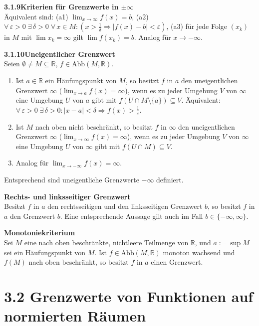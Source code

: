 \documentclass[a4paper,12pt]{article}
\newcommand{\gentry}[3]{%
  \noindent\textbf{#1\quad #2}\nopagebreak\\[0.2em]
  #3\par\smallskip
}
\begin{document}
\gentry{3.1.9}{Kriterien f\"ur Grenzwerte in $\pm\infty$}{%
  \"Aquivalent sind:
  (a1) $\lim_{x \to \infty} f(x) = b$,
  (a2) $\forall\, \varepsilon > 0 \; \exists\, \delta > 0 \; \forall\, x \in M:
       (x > \tfrac{1}{\delta} \Rightarrow |f(x) - b| < \varepsilon)$,
  (a3) f\"ur jede Folge $(x_k)$ in $M$ mit $\lim x_k = \infty$ gilt $\lim f(x_k) = b$.
  Analog f\"ur $x \to -\infty$.
}

\gentry{3.1.10}{Uneigentlicher Grenzwert}{%
  Seien $\emptyset \neq M \subseteq \mathbb{R}$, $f \in \mathrm{Abb}(M, \mathbb{R})$.
  \begin{enumerate}[label=(\arabic*),topsep=2pt,itemsep=1pt]
    \item Ist $a \in \mathbb{R}$ ein H\"aufungspunkt von $M$, so besitzt $f$ in $a$
          den uneigentlichen Grenzwert $\infty$ ($\lim_{x \to a} f(x) = \infty$),
          wenn es zu jeder Umgebung $V$ von $\infty$ eine Umgebung $U$ von $a$ gibt mit
          $f(U \cap M \setminus \{a\}) \subseteq V$.
          \"Aquivalent: $\forall\, \varepsilon > 0 \; \exists\, \delta > 0: |x - a| < \delta \Rightarrow f(x) > \tfrac{1}{\varepsilon}$.
    \item Ist $M$ nach oben nicht beschr\"ankt, so besitzt $f$ in $\infty$ den uneigentlichen
          Grenzwert $\infty$ ($\lim_{x \to \infty} f(x) = \infty$), wenn es zu jeder
          Umgebung $V$ von $\infty$ eine Umgebung $U$ von $\infty$ gibt mit $f(U \cap M) \subseteq V$.
    \item Analog f\"ur $\lim_{x \to -\infty} f(x) = \infty$.
  \end{enumerate}
  Entsprechend sind uneigentliche Grenzwerte $-\infty$ definiert.
}

\gentry{}{Rechts- und linksseitiger Grenzwert}{%
  Besitzt $f$ in $a$ den rechtsseitigen und den linksseitigen Grenzwert $b$, so
  besitzt $f$ in $a$ den Grenzwert $b$. Eine entsprechende Aussage gilt auch im
  Fall $b \in \{-\infty, \infty\}$.
}

\gentry{}{Monotoniekriterium}{%
  Sei $M$ eine nach oben beschr\"ankte, nichtleere Teilmenge von $\mathbb{R}$, und
  $a := \sup M$ sei ein H\"aufungspunkt von $M$. Ist $f \in \mathrm{Abb}(M, \mathbb{R})$
  monoton wachsend und $f(M)$ nach oben beschr\"ankt, so besitzt $f$ in $a$ einen
  Grenzwert.
}

\section*{3.2 \quad Grenzwerte von Funktionen auf normierten R\"aumen}
\end{document}
